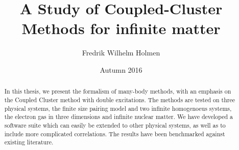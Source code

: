 \documentclass[twoside,english]{uiofysmaster}
\author{Fredrik Wilhelm Holmen}
\title{A Study of Coupled-Cluster Methods for infinite matter}
\date{Autumn 2016}
\begin{document}
\setlength{\belowdisplayskip}{12pt} \setlength{\belowdisplayshortskip}{12pt}
\setlength{\abovedisplayskip}{12pt} \setlength{\abovedisplayshortskip}{12pt}


\maketitle


\begin{abstract}
	In this thesis, we present the formalism of many-body methods,
        with an emphasis on the Coupled Cluster method with double
        excitations. The methods are tested on three physical systems,
        the finite size pairing model and two infinite homogenoeus
        systems, the electron gas in three dimensions and infinite
        nuclear matter. We have developed a software suite which can
        easily be extended to other physical systems, as well as to
        include more complicated correlations. The results have been
        benchmarked against existing literature. 
\end{abstract}
\end{document}
